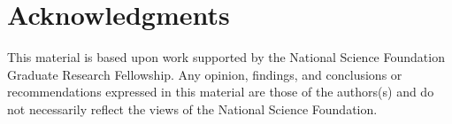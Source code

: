 \documentclass[10pt,letterpaper]{article}
\begin{document}
\section{Acknowledgments}
This material is based upon work supported by the National Science Foundation Graduate Research Fellowship. Any opinion, findings, and conclusions or recommendations expressed in this material are those of the authors(s) and do not necessarily reflect the views of the National Science Foundation.




\setlength{\bibleftmargin}{.125in}
\setlength{\bibindent}{-\bibleftmargin}


\end{document}
